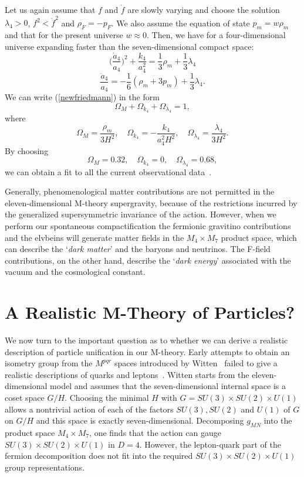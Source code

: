 \documentclass[a4paper,12pt]{article}
\begin{document}
Let us again assume that $f$ and ${\dot f}$ are slowly varying
and choose the solution $\lambda_4>0$, $f^2<{\dot f}^2$
and $\rho_F=-p_F$. We also assume the equation of
state $p_m=w\rho_m$ and that for the present universe $w\approx 0$.
Then, we have for a four-dimensional universe expanding faster
than the seven-dimensional compact space:
\begin{equation}
\label{newfriedmann}
\biggl(\frac{{\dot a}_4}{a_4}\biggr)^2+\frac{k_4}{a_4^2}=
\frac{1}{3}\rho_m + \frac{1}{3}\lambda_4
\end{equation}
\begin{equation}
\label{accel}
\frac{{\ddot a}_4}{a_4}
=-\frac{1}{6}(\rho_m+3p_m)+\frac{1}{3}\lambda_4.
\end{equation}
We can write (\ref{newfriedmann}) in the form
\begin{equation}
\Omega_M+\Omega_{k_4}+\Omega_{\lambda_4}=1,
\end{equation}
where
\begin{equation}
\Omega_M=\frac{\rho_m}{3H^2},\quad
\Omega_{k_4}=-\frac{k_4}{a_4^2H^2},\quad
\Omega_{\lambda_4}=\frac{\lambda_4}{3H^2}.
\end{equation}
By choosing
\begin{equation}
\Omega_M=0.32,\quad \Omega_{k_4}=0,\quad \Omega_{\lambda_4}=0.68,
\end{equation}
we can obtain a fit to all the current observational
data~\cite{Perlmutter,Netterfield}.

Generally, phenomenological matter contributions are not
permitted in the eleven-dimensional M-theory supergravity,
because of the restrictions incurred by the generalized
supersymmetric invariance of the action. However, when we perform our
spontaneous compactification the fermionic gravitino
contributions and the elvbeins will generate matter fields in the $M_4\times M_7$
product space, which can describe the `{\it dark matter}' and the baryons and
neutrinos. The F-field contributions, on the other hand, describe the `{\it dark
energy}' associated with the vacuum and the cosmological constant.

\section{\bf A Realistic M-Theory of Particles?}

We now turn to the important question as to whether we can derive a
realistic description of particle unification in our M-theory.
Early attempts to obtain an isometry group from the $M^{pqr}$
spaces introduced by Witten~\cite{Witten4} failed to give a
realistic descriptions of quarks and leptons~\cite{Duff2}.
Witten starts from the eleven-dimensional model and assumes that
the seven-dimensional internal space is a coset space $G/H$.
Choosing the minimal $H$ with $G=SU(3)\times SU(2)\times U(1)$
allows a nontrivial action of each of the factors $SU(3), SU(2)$
and $U(1)$ of $G$ on $G/H$ and this space is exactly
seven-dimensional. Decomposing $g_{MN}$ into the product
space $M_4\times M_7$, one finds that the action can gauge
$SU(3)\times SU(2)\times U(1)$ in $D=4$. However, the
lepton-quark part of the fermion decomposition does not fit into
the required $SU(3)\times SU(2)\times U(1)$ group
representations.
\end{document}
